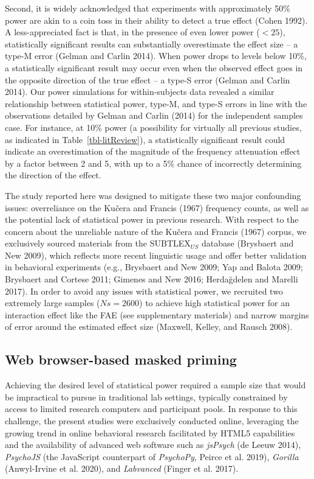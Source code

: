 \documentclass[
]{interact}
\begin{document}
Second, it is widely acknowledged that experiments with approximately
50\% power are akin to a coin toss in their ability to detect a true
effect (Cohen 1992). A less-appreciated fact is that, in the presence of
even lower power (\(<25%
\)), statistically significant results can substantially overestimate
the effect size -- a type-M error (Gelman and Carlin 2014). When power
drops to levels below 10\%, a statistically significant result may occur
even when the observed effect goes in the opposite direction of the true
effect -- a type-S error (Gelman and Carlin 2014). Our power simulations
for within-subjects data revealed a similar relationship between
statistical power, type-M, and type-S errors in line with the
observations detailed by Gelman and Carlin (2014) for the independent
samples case. For instance, at 10\% power (a possibility for virtually
all previous studies, as indicated in Table~\ref{tbl-litReview}), a
statistically significant result could indicate an overestimation of the
magnitude of the frequency attenuation effect by a factor between 2 and
5, with up to a 5\% chance of incorrectly determining the direction of
the effect.

The study reported here was designed to mitigate these two major
confounding issues: overreliance on the Kučera and Francis (1967)
frequency counts, as well as the potential lack of statistical power in
previous research. With respect to the concern about the unreliable
nature of the Kučera and Francis (1967) corpus, we exclusively sourced
materials from the SUBTLEX\(_{US}\) database (Brysbaert and New 2009),
which reflects more recent linguistic usage and offer better validation
in behavioral experiments (e.g., Brysbaert and New 2009; Yap and Balota
2009; Brysbaert and Cortese 2011; Gimenes and New 2016; Herdağdelen and
Marelli 2017). In order to avoid any issues with statistical power, we
recruited two extremely large samples (\(Ns=2600\)) to achieve high
statistical power for an interaction effect like the FAE (see
supplementary materials) and narrow margins of error around the
estimated effect size (Maxwell, Kelley, and Rausch 2008).

\subsection{Web browser-based masked
priming}\label{web-browser-based-masked-priming}

Achieving the desired level of statistical power required a sample size
that would be impractical to pursue in traditional lab settings,
typically constrained by access to limited research computers and
participant pools. In response to this challenge, the present studies
were exclusively conducted online, leveraging the growing trend in
online behavioral research facilitated by HTML5 capabilities and the
availability of advanced web software such as \emph{jsPsych} (de Leeuw
2014), \emph{PsychoJS} (the JavaScript counterpart of \emph{PsychoPy},
Peirce et al. 2019), \emph{Gorilla} (Anwyl-Irvine et al. 2020), and
\emph{Labvanced} (Finger et al. 2017).
\end{document}
